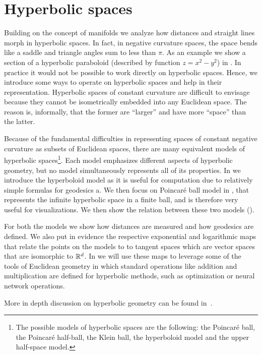\section{Hyperbolic spaces}
Building on the concept of manifolds we analyze how distances and straight lines morph in hyperbolic spaces. In fact, in negative curvature spaces, the space bends like a saddle and triangle angles sum to less than $\pi$. As an example we show a section of a hyperbolic paraboloid (described by function $z=x^2-y^2$) in . In practice it would not be possible to work directly on hyperbolic spaces. Hence, we introduce some ways to operate on hyperbolic spaces and help in their representation. Hyperbolic spaces of constant curvature are difficult to envisage because they cannot be isometrically embedded into any Euclidean space. The reason is, informally, that the former are ``larger'' and have more ``space'' than the latter.  

Because of the fundamental difficulties in representing spaces of constant negative curvature as subsets of Euclidean spaces, there are many equivalent models of hyperbolic spaces\footnote{The possible models of hyperbolic spaces are the following: the Poincaré ball, the Poincaré half-ball, the Klein ball, the hyperboloid model and the upper half-space model.}. Each model emphasizes different aspects of hyperbolic geometry, but no model simultaneously represents all of its properties. In  we introduce the hyperboloid model as it is useful for computation due to relatively simple formulas for geodesics a. We then focus on Poincaré ball model in , that represents the infinite hyperbolic space in a finite ball, and is therefore very useful for visualizations. We then show the relation between these two models ().

For both the models we show how distances are measured and how geodesics are defined. We also put in evidence the respective exponential and logarithmic maps that relate the points on the models to to tangent spaces which are vector spaces that are isomorphic to $\mathbb{R}^d$. In  we will use these maps to leverage some of the tools of Euclidean geometry in which standard operations like addition and multiplication are defined for hyperbolic methods, such as optimization or neural network operations.

More in depth discussion on hyperbolic geometry can be found in~\cite{Anderson2006hyperbolicGeometry}\cite{Ramsay2013introductionHyperbolicGeometry}.

